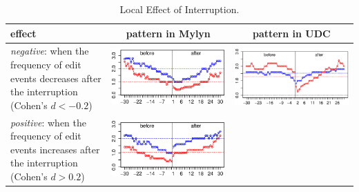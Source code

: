 \documentclass[times]{smrauth}
\begin{document}
\begin{table}[ht!]
\caption{Local Effect of Interruption. }
\label{tbl:local_effect}
\centering
\begin{tabular}{p{5cm} | c | c}
effect & pattern in Mylyn & pattern in UDC \\
\hline
\textit{negative}: when the frequency of edit events decreases after the interruption (Cohen's $d < -0.2$)
	& \includegraphics[valign=m,scale=0.3]{figures/neg_ints}
	& \includegraphics[valign=m,scale=0.24]{figures/udc_neg_ints_2}  \\
\textit{positive}: when the frequency of edit events increases after the interruption (Cohen's $d > 0.2$)
	& \includegraphics[valign=m,scale=0.3]{figures/pos_ints}

\end{tabular}
\end{table}
\end{document}
